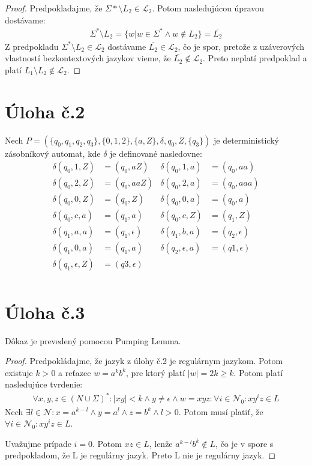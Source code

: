 \documentclass[10pt]{article}
\begin{document}
\begin{enumerate}
\begin{proof}
        Predpokladajme, že $\Sigma* \setminus L_2 \in \mathcal{L}_2$. Potom nasledujúcou úpravou
        dostávame:
        \begin{align*}
            \Sigma^* \setminus L_2 = \{w | w \in \Sigma^* \land w \notin L_2 \} = \overline{L_2} 
        \end{align*}
        Z predpokladu $ \Sigma^* \setminus L_2 \in \mathcal{L}_2$ dostávame $\overline{L_2} \in
        \mathcal{L}_2$, čo je spor, pretože z uzáverových vlastností bezkontextových jazykov vieme,
        že $\overline{L_2} \notin \mathcal{L}_2$. Preto neplatí predpoklad a platí $L_1 \setminus L_2 \notin
        \mathcal{L}_2$.
    \end{proof}
\end{enumerate}
\section*{Úloha č.2}
    Nech $P = (\{q_0, q_1, q_2, q_3\}, \{0,1,2\}, \{a,Z\}, \delta, q_0, Z, \{q_3\})$ je deterministický zásobníkový automat, kde
    $\delta$ je definované nasledovne:
    \begin{align*}
        \delta (q_0, 1, Z) &= (q_0, aZ)  & \delta (q_0, 1, a) &= (q_0, aa)\\
        \delta (q_0, 2, Z) &= (q_0, aaZ) & \delta (q_0, 2, a) &= (q_0, aaa)\\
        \delta (q_0, 0, Z) &= (q_0, Z)   & \delta (q_0, 0, a) &= (q_0, a)\\
        \delta (q_0, c, a) &= (q_1, a)   & \delta (q_0, c, Z) &= (q_1, Z)\\
        \delta (q_1, a, a) &= (q_1, \epsilon) & \delta (q_1, b, a) &= (q_2, \epsilon)\\
        \delta (q_1, 0, a) &= (q_1, a)   & \delta (q_2, \epsilon, a) &= (q1, \epsilon)\\
        \delta (q_1, \epsilon, Z) &= (q3, \epsilon)\\
    \end{align*}


\section*{Úloha č.3}
Dôkaz je prevedený pomocou Pumping Lemma. 
\begin{proof}
Predpokládajme, že jazyk z úlohy č.2 je regulárnym jazykom. Potom existuje $k > 0$ a reťazec $w =
a^kb^k$, pre ktorý platí $|w| = 2k \geq k$. Potom platí nasledujúce tvrdenie:
\begin{align*}
    \forall x,y,z \in (N \cup \Sigma)^*: |xy| < k \land y \neq \epsilon \land w = xyz: \forall i \in
    \mathcal{N}_0: xy^iz \in L 
\end{align*}
    Nech $\exists l\in \mathcal{N}: x = a^{k-l} \land y = a^{l} \land z = b^k \land l > 0$. Potom musí platiť, že $\forall
i \in \mathcal{N}_0: xy^iz \in L$.

Uvažujme prípade $i = 0$. Potom $xz \in L$, lenže $a^{k-l}b^k \notin L$, čo je v spore s
predpokladom, že L je regulárny jazyk. Preto L nie je regulárny jazyk.
\end{proof}
\end{document}
